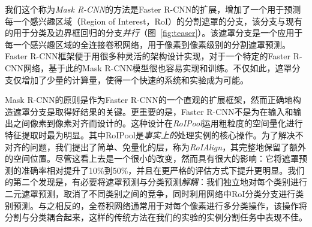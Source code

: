 我们这个称为\emph{Mask R-CNN}的方法是Faster R-CNN的扩展，增加了一个用于预测每一个感兴趣区域（Region of Interest，RoI）的分割遮罩的分支，该分支与现有的用于分类及边界框回归的分支\emph{并行}（图~\ref{fig:teaser}）。该遮罩分支是一个应用于每一个感兴趣区域的全连接卷积网络，用于像素到像素级别的分割遮罩预测。Faster R-CNN框架便于用很多种灵活的架构设计实现，对于一个特定的Faster R-CNN网络，基于此的Mask R-CNN模型很也容易实现和训练。不仅如此，遮罩分支仅增加了少量的计算量，使得一个快速的系统和实验成为可能。

Mask R-CNN的原则是作为Faster R-CNN的一个直观的扩展框架，然而正确地构造遮罩分支是取得好结果的关键。更重要的是，Faster R-CNN不是为在输入和输出之间像素到像素对齐而设计的。这种设计在\emph{RoIPool}运用粗粒度的空间量化进行特征提取时最为明显。其中RoIPool是\emph{事实上的}处理实例的核心操作。为了解决不对齐的问题，我们提出了简单、免量化的层，称为\emph{RoIAlign}，其完整地保留了额外的空间位置。尽管这看上去是一个很小的改变，然而具有很大的影响：它将遮罩预测的准确率相对提升了10\%到50\%，并且在更严格的评估方式下提升更明显。我们的第二个发现是，有必要将遮罩预测与分类预测\emph{解耦}：我们独立地对每个类别进行二元遮罩预测，取消了不同类别之间的竞争，同时利用网络中RoI分类分支进行类别预测。与之相反的，全卷积网络通常用于对每个像素进行多分类操作，该操作将分割与分类耦合起来，这样的传统方法在我们的实验的实例分割任务中表现不佳。

